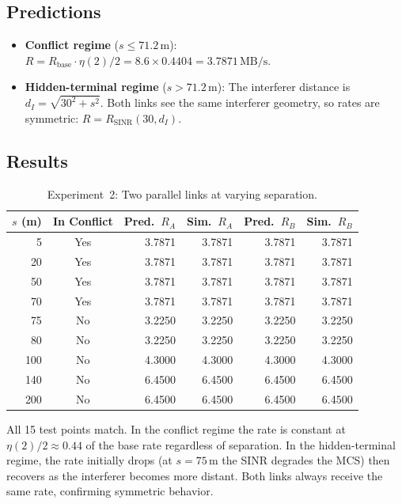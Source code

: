 \documentclass[11pt,a4paper]{article}
\newcommand{\MBs}{\,\text{MB/s}}
\begin{document}
\subsection{Predictions}
\begin{itemize}    \item \textbf{Conflict regime} ($s \leq 71.2\,$m): $R = R_{\text{base}} \cdot \eta(2)/2 = 8.6 \times 0.4404 = 3.7871\MBs$.
    \item \textbf{Hidden-terminal regime} ($s > 71.2\,$m): The interferer distance is $d_I = \sqrt{30^2 + s^2}$. Both links see the same interferer geometry, so rates are symmetric: $R = R_{\text{SINR}}(30, d_I)$.
\end{itemize}

\subsection{Results}

\begin{table}[h]
\centering
\caption{Experiment~2: Two parallel links at varying separation.}
\label{tab:exp2}
\begin{tabular}{rcrrrr}
\toprule
$s$ (m) & In Conflict & Pred.\ $R_A$ & Sim.\ $R_A$ & Pred.\ $R_B$ & Sim.\ $R_B$ \\
\midrule
  5 & Yes & 3.7871 & 3.7871 & 3.7871 & 3.7871 \\
 20 & Yes & 3.7871 & 3.7871 & 3.7871 & 3.7871 \\
 50 & Yes & 3.7871 & 3.7871 & 3.7871 & 3.7871 \\
 70 & Yes & 3.7871 & 3.7871 & 3.7871 & 3.7871 \\
 75 & No  & 3.2250 & 3.2250 & 3.2250 & 3.2250 \\
 80 & No  & 3.2250 & 3.2250 & 3.2250 & 3.2250 \\
100 & No  & 4.3000 & 4.3000 & 4.3000 & 4.3000 \\
140 & No  & 6.4500 & 6.4500 & 6.4500 & 6.4500 \\
200 & No  & 6.4500 & 6.4500 & 6.4500 & 6.4500 \\
\bottomrule
\end{tabular}
\end{table}

All 15 test points match. In the conflict regime the rate is constant at $\eta(2)/2 \approx 0.44$ of the base rate regardless of separation. In the hidden-terminal regime, the rate initially drops (at $s=75\,$m the SINR degrades the MCS) then recovers as the interferer becomes more distant. Both links always receive the same rate, confirming symmetric behavior.
\end{document}
